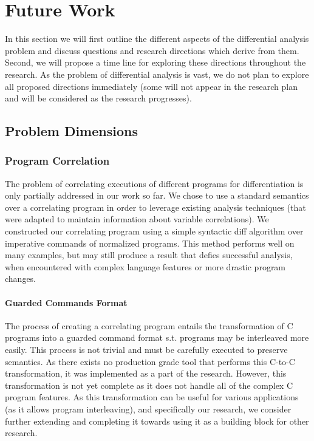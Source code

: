 \section{Future Work}

In this section we will first outline the different aspects of the differential analysis problem and discuss questions and research directions which derive from them. Second, we will propose a time line for exploring these directions throughout the research. As the problem of differential analysis is vast, we do not plan to explore all proposed directions immediately (some will not appear in the research plan and will be considered as the research progresses).

\subsection{Problem Dimensions}

\subsubsection{Program Correlation}

The problem of correlating executions of different programs for differentiation is only partially addressed in our work so far. We chose to use a standard semantics over a correlating program in order to leverage existing analysis techniques (that were adapted to maintain information about variable correlations). We constructed our correlating program using a simple syntactic diff algorithm over imperative commands of normalized programs. This method performs well on many examples, but may still produce a result that defies successful analysis, when encountered with complex language features or more drastic program changes. 

\paragraph{Guarded Commands Format}
The process of creating a correlating program entails the transformation of C programs into a guarded command format s.t. programs may be interleaved more easily. This process is not trivial and must be carefully executed to preserve semantics. As there exists no production grade tool that performs this C-to-C transformation, it was implemented as a part of the research. However, this transformation is not yet complete as it does not handle all of the complex C program features. As this transformation can be useful for various applications (as it allows program interleaving), and specifically our research, we consider further extending and completing it towards using it as a building block for other research.

